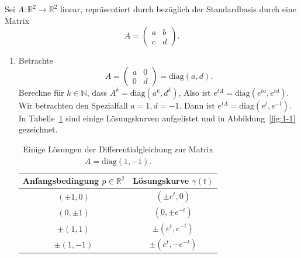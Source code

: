 \documentclass[../main.tex]{subfiles}
\begin{document}
\begin{examples}
  Sei $A \colon \mathbb{R}^2 \to \mathbb{R}^2$ linear,
  repräsentiert durch bezüglich der Standardbasis
  durch eine Matrix
  \[
    A =
    \begin{pmatrix}
      a & b \\ c & d
    \end{pmatrix}.
  \]
  \begin{enumerate}[(1)]
    \item Betrachte
      \[
        A =
        \begin{pmatrix}
          a & 0 \\ 0 & d
        \end{pmatrix} = \text{diag}(a, d).
      \]
      Berechne für $k \in \mathbb{N}$, dass
      \(
        A^k =
        \text{diag}(a^k, d^k)
      \),
      Also ist
      \(
        e^{tA} =
        \text{diag}(
        e^{ta}, e^{td})
      \).
      Wir betrachten den Spezialfall $a = 1, d = -1$.
      Dann ist
      \(
        e^{tA} = 
        \text{diag}(
          e^t, e^{-t}
          )
      \).
      In Tabelle~\ref{tab:1-1} sind einige
      Lösungskurven aufgelistet und in Abbildung~\ref{fig:1-1}
      gezeichnet.
      
      \begin{table}[htb]
        \center
        \begin{tabular}{c|c}
          Anfangsbedingung $p \in \mathbb{R}^2$ & Lösungskurve $\gamma(t)$\\
          \hline
          $(\pm 1, 0)$ & $( \pm e^t, 0)$ \\
          $(0, \pm 1)$ & $(0, \pm e^{-t})$ \\
          $\pm(1, 1)$ & $\pm(e^t, e^{-t})$ \\
          $\pm (1, -1)$ & $\pm (e^t, -e^{-t})$
        \end{tabular}
        \caption{Einige Lösungen der Differentialgleichung
        zur Matrix $A = \text{diag}(1, -1)$.}%
        \label{tab:1-1}
      \end{table}


\end{enumerate}
\end{examples}
\end{document}
